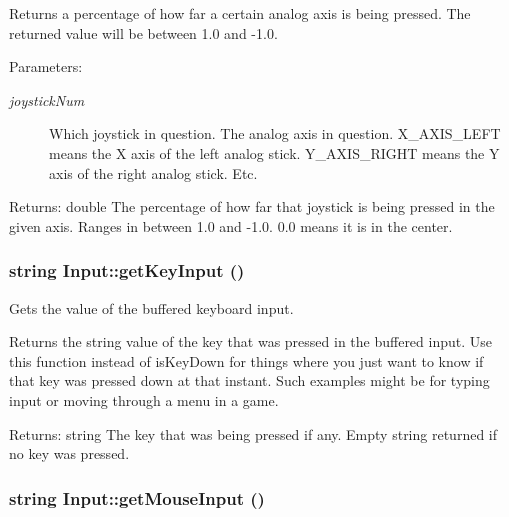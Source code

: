 Returns a percentage of how far a certain analog axis is being pressed. The returned value will be between 1.0 and -1.0. \begin{Desc}
\item[Parameters:]
\begin{description}
\item[{\em joystickNum}]Which joystick in question.  The analog axis in question. X\_\-AXIS\_\-LEFT means the X axis of the left analog stick. Y\_\-AXIS\_\-RIGHT means the Y axis of the right analog stick. Etc. \end{description}
\end{Desc}
\begin{Desc}
\item[Returns:]double The percentage of how far that joystick is being pressed in the given axis. Ranges in between 1.0 and -1.0. 0.0 means it is in the center. \end{Desc}
\hypertarget{class_input_1c744fa7df4499ec4da63cc283f9421f}{
\subsubsection[{getKeyInput}]{\setlength{\rightskip}{0pt plus 5cm}string Input::getKeyInput ()}}
\label{class_input_1c744fa7df4499ec4da63cc283f9421f}


Gets the value of the buffered keyboard input. 

Returns the string value of the key that was pressed in the buffered input. Use this function instead of isKeyDown for things where you just want to know if that key was pressed down at that instant. Such examples might be for typing input or moving through a menu in a game. \begin{Desc}
\item[Returns:]string The key that was being pressed if any. Empty string returned if no key was pressed. \end{Desc}
\hypertarget{class_input_2076359bf82d116ae3b1a91db1c123f2}{
\subsubsection[{getMouseInput}]{\setlength{\rightskip}{0pt plus 5cm}string Input::getMouseInput ()}}
\label{class_input_2076359bf82d116ae3b1a91db1c123f2}


